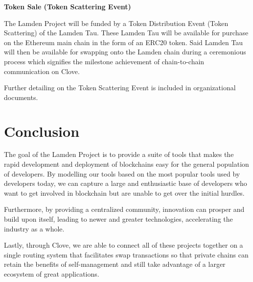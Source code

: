 \documentclass{%
	article}
\begin{document}
\begin{center}
\textbf{Token Sale (Token Scattering Event)}
\end{center}

The Lamden Project will be funded by a Token Distribution Event (Token Scattering) of the Lamden Tau. These Lamden Tau will be available for purchase on the Ethereum main chain in the form of an ERC20 token. Said Lamden Tau will then be available for swapping onto the Lamden chain during a ceremonious process which signifies the milestone achievement of chain-to-chain communication on Clove.

Further detailing on the Token Scattering Event is included in organizational documents.

\section{Conclusion}

The goal of the Lamden Project is to provide a suite of tools that makes the rapid development and deployment of blockchains easy for the general population of developers. By modelling our tools based on the most popular tools used by developers today, we can capture a large and enthusiastic base of developers who want to get involved in blockchain but are unable to get over the initial hurdles.

Furthermore, by providing a centralized community, innovation can prosper and build upon itself, leading to newer and greater technologies, accelerating the industry as a whole.

Lastly, through Clove, we are able to connect all of these projects together on a single routing system that facilitates swap transactions so that private chains can retain the benefits of self-management and still take advantage of a larger ecosystem of great applications.


{}

\end{document}
